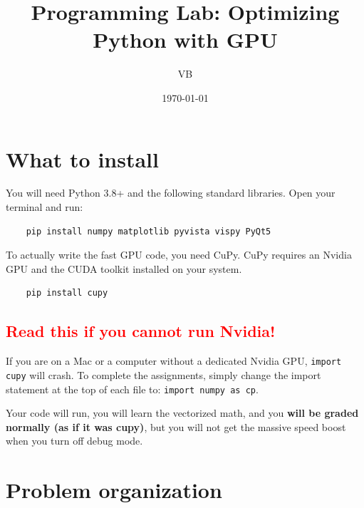 \documentclass[11pt]{article}
\title{Programming Lab: Optimizing Python with GPU}
\author{VB}
\date{\today}
\begin{document}
\maketitle



\section*{What to install}


You will need Python 3.8+ and the following standard libraries.
Open your terminal and run:
\begin{lstlisting}
    pip install numpy matplotlib pyvista vispy PyQt5
\end{lstlisting}

To actually write the fast GPU code, you need CuPy. CuPy requires an Nvidia GPU and the CUDA toolkit installed on your system.
\begin{lstlisting}
    pip install cupy
\end{lstlisting}


\subsection*{\textcolor{red}{Read this if you cannot run Nvidia!}}

If you are on a Mac or a computer without a dedicated Nvidia GPU, \lstinline|import cupy| will crash. To complete the assignments, simply change the import statement at the top of each file to: \lstinline|import numpy as cp|.

Your code will run, you will learn the vectorized math, and you \textbf{will be graded normally (as if it was cupy)}, but you will not get the massive speed boost when you turn off debug mode.


\section*{Problem organization}
\end{document}
